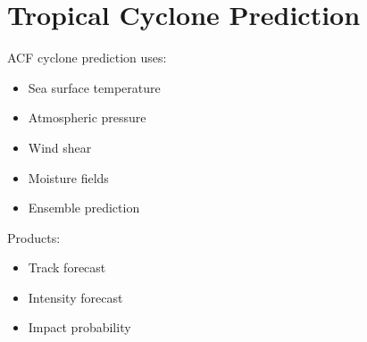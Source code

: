 \section{Tropical Cyclone Prediction}


ACF cyclone prediction uses:


\begin{itemize}

\item Sea surface temperature

\item Atmospheric pressure

\item Wind shear

\item Moisture fields

\item Ensemble prediction

\end{itemize}



Products:


\begin{itemize}

\item Track forecast

\item Intensity forecast

\item Impact probability

\end{itemize}
